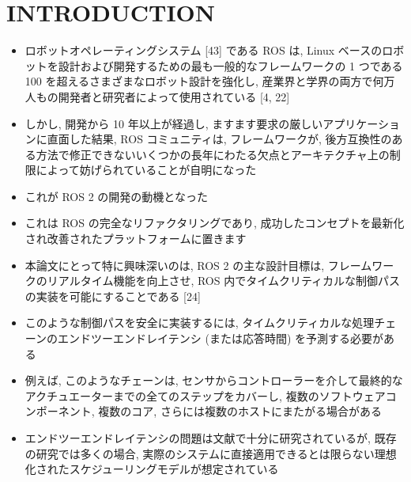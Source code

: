 
\section{INTRODUCTION}
\label{sec: introduction}

\begin{frame}{}
    \begin{itemize}
        \item ロボットオペレーティングシステム [43] である ROS は, Linux ベースのロボットを設計および開発するための最も一般的なフレームワークの 1 つである 100 を超えるさまざまなロボット設計を強化し, 産業界と学界の両方で何万人もの開発者と研究者によって使用されている [4, 22]
        \item しかし, 開発から 10 年以上が経過し, ますます要求の厳しいアプリケーションに直面した結果, ROS コミュニティは, フレームワークが, 後方互換性のある方法で修正できないいくつかの長年にわたる欠点とアーキテクチャ上の制限によって妨げられていることが自明になった
    \end{itemize}
\end{frame}

\begin{frame}{}
    \begin{itemize}
        \item これが ROS 2 の開発の動機となった
        \item これは ROS の完全なリファクタリングであり, 成功したコンセプトを最新化され改善されたプラットフォームに置きます
        \item 本論文にとって特に興味深いのは, ROS 2 の主な設計目標は, フレームワークのリアルタイム機能を向上させ, ROS 内でタイムクリティカルな制御パスの実装を可能にすることである [24]
    \end{itemize}
\end{frame}


\begin{frame}{}
    \begin{itemize}
        \item このような制御パスを安全に実装するには, タイムクリティカルな処理チェーンのエンドツーエンドレイテンシ (または応答時間) を予測する必要がある
        \item 例えば, このようなチェーンは, センサからコントローラーを介して最終的なアクチュエーターまでの全てのステップをカバーし, 複数のソフトウェアコンポーネント, 複数のコア, さらには複数のホストにまたがる場合がある
        \item エンドツーエンドレイテンシの問題は文献で十分に研究されているが, 既存の研究では多くの場合, 実際のシステムに直接適用できるとは限らない理想化されたスケジューリングモデルが想定されている
    \end{itemize}
\end{frame}

